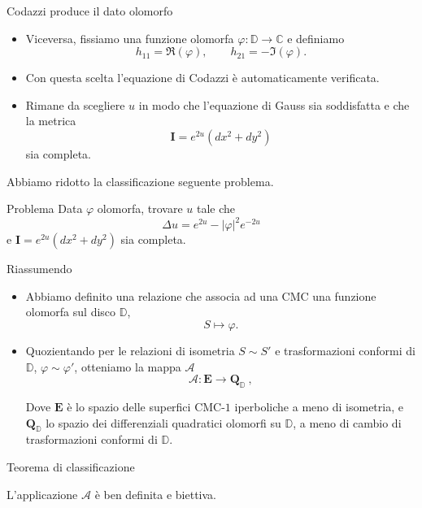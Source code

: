 \documentclass[aspectratio=169,11pt]{beamer}
\newcommand{\C}{\mathbb{C}}
\newcommand{\D}{\mathbb{D}}
\newcommand{\QDD}{\mathbf{Q}_{\D}}
\newcommand{\EE}{\mathbf{E}}
\newcommand{\Amap}{\mathcal{A}}
\newcommand{\I}{\mathbf{I}}
\begin{document}
\begin{frame}{Codazzi produce il dato olomorfo}
\begin{itemize}
	\setlength\itemsep{2mm}

	\item Viceversa, fissiamo una funzione olomorfa
	$\varphi:\D\to\C$ e definiamo
	\[
		h_{11}=\Re(\varphi),
		\qquad
		h_{21}=-\Im(\varphi).
	\]

	\item Con questa scelta l'equazione di Codazzi è automaticamente
	verificata.

	\item Rimane da scegliere $u$ in modo che l'equazione di Gauss sia
	soddisfatta e che la metrica
	\[
		\I=e^{2u}(dx^2+dy^2)
	\]
	sia completa.
\end{itemize}

Abbiamo ridotto la classificazione seguente problema.
\begin{center}
\vspace{-2mm}
\begin{minipage}{0.72\textwidth}
\begin{block}{Problema}
		Data $\varphi$ olomorfa, trovare $u$ tale che
		\[
			\Delta u=e^{2u}-|\varphi|^2e^{-2u}
		\]
		e
		$\I=e^{2u}(dx^2+dy^2)$ sia completa.
\end{block}
\end{minipage}
\end{center}
\end{frame}
\begin{frame}{Riassumendo}
\begin{itemize}
	\item Abbiamo definito una relazione che associa ad una CMC una funzione olomorfa sul disco $\mathbb{D}$, \[ S \mapsto \varphi .\] 
	\item Quozientando per le relazioni di isometria $S \sim S'$ e trasformazioni conformi di $\mathbb{D}$, $\varphi \sim \varphi'$, otteniamo la mappa $\Amap$
		\[\Amap : \mathbf{E} \to \QDD\ ,\] 

	Dove $\EE$ è lo spazio delle superfici CMC-$1$ iperboliche a meno di isometria, e $\QDD$ lo spazio dei differenziali quadratici olomorfi su $\D$, a meno di cambio di trasformazioni conformi di $\mathbb{D}$.
\end{itemize}
\vspace{2mm}
\begin{center}
\begin{minipage}{0.68\textwidth}
\begin{block}{Teorema di classificazione}
	\begin{center}
		L'applicazione $\Amap$ è ben definita e biettiva.
	\end{center}
\end{block}
\end{minipage}
\end{center}

\vspace{1mm}
\end{frame}
\end{document}
